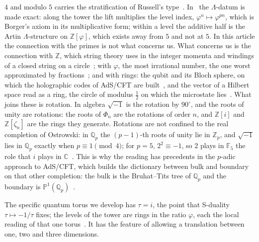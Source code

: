 \documentclass[11pt,reqno]{amsart}
\newcommand{\golden}{\varphi}
\numberwithin{equation}{section}
\theoremstyle{remark}
\begin{document}
$4$ and modulo $5$ carries the stratification of Russell's type~\cite{HP26}. In~\cite{F1} the
$\Lambda$-datum is made exact: along the tower the lift multiplies the level index,
$\golden^n\mapsto\golden^{pn}$, which is Borger's axiom in its multiplicative form; within a level the
additive half is the Artin $\Lambda$-structure on $\mathbb Z[\golden]$, which exists away from $5$ and
not at $5$. In this article the connection with the primes is not what concerns us.
What concerns us is the connection with $\mathbb Z$, which string theory uses in the integer momenta
and windings of a closed string on a circle~\cite{Pol98}; with $\golden$, the most irrational number,
the one worst approximated by fractions~\cite{Hur91}; and with rings: the qubit and its Bloch sphere,
on which the holographic codes of AdS/CFT are built~\cite{NC00,PYHP15}, and the vector of a Hilbert
space read as a ring, the circle of modulus $\tfrac12$ on which the microstate lies~\cite{CW6}. What joins
these is rotation. In algebra $\sqrt{-1}$ is the rotation by $90^\circ$, and the roots of unity are
rotations: the roots of $\Phi_n$ are the rotations of order $n$, and $\mathbb Z[i]$ and
$\mathbb Z[\zeta_n]$ are the rings they generate. Rotations are not confined to the real completion
of Ostrowski: in $\mathbb Q_p$ the $(p-1)$-th roots of unity lie in $\mathbb Z_p$, and $\sqrt{-1}$
lies in $\mathbb Q_p$ exactly when $p\equiv1\pmod 4$; for $p=5$, $2^2\equiv-1$, so $2$ plays in
$\mathbb F_5$ the role that $i$ plays in $\mathbb C$~\cite{CW6}. This is why the reading has
precedents in the $p$-adic approach to AdS/CFT, which builds the dictionary between bulk and boundary
on that other completion: the bulk is the Bruhat--Tits tree of $\mathbb Q_p$ and the boundary is
$\mathbb P^1(\mathbb Q_p)$~\cite{GKPSW17,HMSS18}.

The specific quantum torus we develop has $\tau=i$, the point that S-duality $\tau\mapsto-1/\tau$
fixes; the levels of the tower are rings in the ratio $\golden$, each the local reading of that one
torus~\cite{CW6}. It has the feature of allowing a translation between one, two and three
dimensions.
\end{document}
